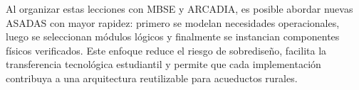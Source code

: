 \documentclass[conference]{IEEEtran}
\begin{document}
Al organizar estas lecciones con MBSE y ARCADIA, es posible abordar nuevas ASADAS con mayor rapidez: primero se modelan necesidades operacionales, luego se seleccionan módulos lógicos y finalmente se instancian componentes físicos verificados. Este enfoque reduce el riesgo de sobrediseño, facilita la transferencia tecnológica estudiantil y permite que cada implementación contribuya a una arquitectura reutilizable para acueductos rurales.



\end{document}
